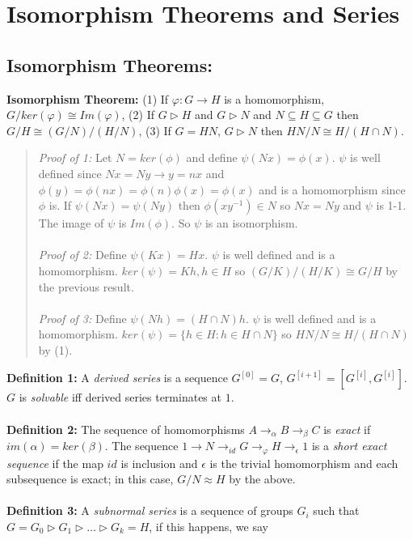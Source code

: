 \chapter{Isomorphism Theorems and Series}
\section {Isomorphism Theorems:} 
{\bf Isomorphism Theorem:} (1) If $\varphi: G \rightarrow H$ is a homomorphism,
$G/ker(\varphi) \cong Im(\varphi)$, 
(2)  If
$G \triangleright H$ and $G \triangleright N$ and $N \subseteq H \subseteq G$
then $G/H \cong (G/N)/(H/N)$, 
(3) If $G=HN$, $G \triangleright N$ then
$HN/N \cong H/(H \cap N)$.
\begin{quote}
\emph{Proof of 1:}  Let $N= ker(\phi)$ and define $\psi(Nx)= \phi(x)$.  $\psi$ is 
well defined since $Nx=Ny \rightarrow y=nx$ and $\phi(y)= \phi(nx)= \phi(n) \phi(x)= \phi(x)$
and is a homomorphism since $\phi$ is.
If $\psi(Nx)=\psi(Ny)$ then $\phi(xy^{-1}) \in N$ so $Nx=Ny$ and $\psi$ is 1-1.  The image
of $\psi$ is $Im(\phi)$. So $\psi$ is an isomorphism.
\\
\\
\emph{Proof of 2:}  Define $\psi(Kx)= Hx$.  $\psi$ is well defined and is a homomorphism.
$ker(\psi)= Kh, h \in H$ so $(G/K)/(H/K) \cong G/H$ by the previous result.
\\
\\
\emph{Proof of 3:}  Define $\psi(Nh)= (H \cap N) h$.  $\psi$ is well defined and is a homomorphism.
$ker(\psi)=  \{ h \in H: h \in H \cap N \}$ so $HN/N \cong H/(H \cap N)$ by (1).
\end{quote}
{\bf Definition 1:}
A \emph{derived series} is a sequence $G^{[0]}=G$, $G^{[i+1]}= [G^{[i]}, G^{[i]}]$.  
$G$ is \emph{solvable} iff
derived series terminates at ${1}$.  
\\
\\
{\bf Definition 2:} The sequence of homomorphisms $A \rightarrow_{\alpha} B \rightarrow_{\beta} C$ is
\emph{exact} if $im(\alpha )= ker( \beta)$.  The sequence
$1 \rightarrow N \rightarrow_{id} G \rightarrow_{\varphi} H \rightarrow_{\epsilon} 1 $ is a 
\emph{short exact sequence} if the map $id$ is inclusion and $\epsilon$ is the trivial homomorphism and
each subsequence is exact; in this case, 
$G/N \approx H$ by the above.
\\
\\
{\bf Definition 3:}
A \emph{subnormal series} is a sequence of groups $G_i$ such that
$G= G_0 \rhd G_1 \rhd \ldots \rhd G_k =H$, if this happens, we say
